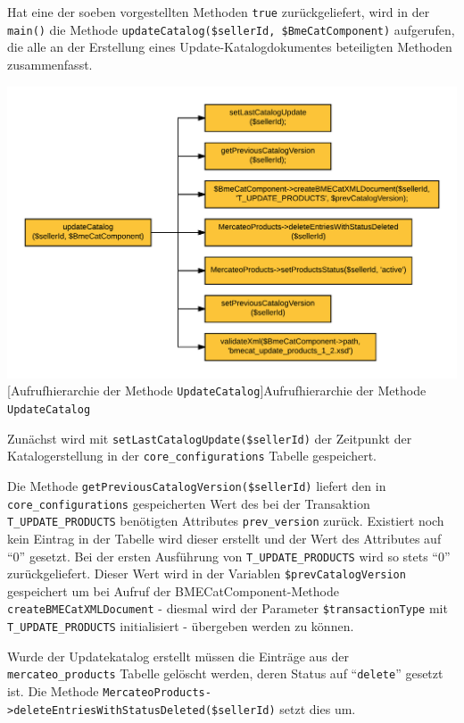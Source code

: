 {	Hat eine der soeben vorgestellten Methoden \texttt{true} zurückgeliefert, wird in der \texttt{main()} die Methode \texttt{updateCatalog(\$sellerId, \$BmeCatComponent)} aufgerufen, die alle an der Erstellung eines Update-Katalogdokumentes beteiligten Methoden zusammenfasst.
	
	\begin{minipage}{\linewidth}
		\vspace{1em}
		\centering
		\includegraphics[width=0.7 \linewidth]{img/updateKatalogAufrufhierarchie}
		[Aufrufhierarchie der Methode \texttt{UpdateCatalog}]{Aufrufhierarchie der Methode \texttt{UpdateCatalog}}
		\vspace{1em}
	\end{minipage}
	
	Zunächst wird mit \texttt{setLastCatalogUpdate(\$sellerId)} der Zeitpunkt der Katalogerstellung in der \texttt{core\_configurations} Tabelle gespeichert.  
	
	Die Methode \texttt{getPreviousCatalogVersion(\$sellerId)} liefert den in \texttt{core\_configurations} gespeicherten Wert des bei der Transaktion \texttt{T\_UPDATE\_PRODUCTS} benötigten Attributes \texttt{prev\_version} zurück. Existiert noch kein Eintrag in der Tabelle wird dieser erstellt und der Wert des Attributes auf \enquote{0} gesetzt. Bei der ersten Ausführung von \texttt{T\_UPDATE\_PRODUCTS} wird so stets \enquote{0} zurückgeliefert. Dieser Wert wird in der Variablen \texttt{\$prevCatalogVersion} gespeichert um bei Aufruf der BMECatComponent-Methode \texttt{createBMECatXMLDocument} - diesmal wird der Parameter \texttt{\$transactionType} mit \texttt{T\_UPDATE\_PRODUCTS} initialisiert - übergeben werden zu können.
	
	Wurde der Updatekatalog erstellt müssen die Einträge aus der \texttt{mercateo\_products} Tabelle gelöscht werden, deren Status auf \enquote{\texttt{delete}} gesetzt ist. Die Methode \texttt{MercateoProducts->deleteEntries\-WithStatus\-Deleted(\$sellerId)} setzt dies um.
	
}
